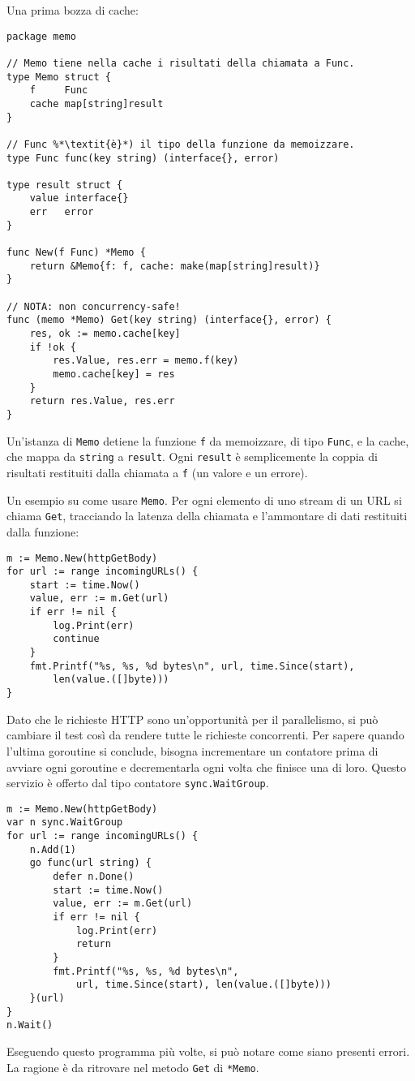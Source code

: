 \documentclass[../../thesis.tex]{subfiles}
\begin{document}
    Una prima bozza di cache:
    \begin{lstlisting}[frame = single,label={lst:lstlisting9-7.2}]
package memo

// Memo tiene nella cache i risultati della chiamata a Func.
type Memo struct {
    f     Func
    cache map[string]result
}

// Func %*\textit{è}*) il tipo della funzione da memoizzare.
type Func func(key string) (interface{}, error)

type result struct {
    value interface{}
    err   error
}

func New(f Func) *Memo {
    return &Memo{f: f, cache: make(map[string]result)}
}

// NOTA: non concurrency-safe!
func (memo *Memo) Get(key string) (interface{}, error) {
    res, ok := memo.cache[key]
    if !ok {
        res.Value, res.err = memo.f(key)
        memo.cache[key] = res
    }
    return res.Value, res.err
}
    \end{lstlisting}
    Un'istanza di \verb"Memo" detiene la funzione \verb"f" da memoizzare, di tipo \verb"Func", e la cache, che mappa da \verb"string" a \verb"result".
    Ogni \verb"result" è semplicemente la coppia di risultati restituiti dalla chiamata a \verb"f" (un valore e un errore).
    \hfill \vspace{12pt}

    Un esempio su come usare \verb"Memo".
    Per ogni elemento di uno stream di un URL si chiama \verb"Get", tracciando la latenza della chiamata e l'ammontare di dati restituiti dalla funzione:
    \begin{lstlisting}[frame = single,label={lst:lstlisting9-7.3}]
m := Memo.New(httpGetBody)
for url := range incomingURLs() {
    start := time.Now()
    value, err := m.Get(url)
    if err != nil {
        log.Print(err)
        continue
    }
    fmt.Printf("%s, %s, %d bytes\n", url, time.Since(start),
        len(value.([]byte)))
}
    \end{lstlisting}
    Dato che le richieste HTTP sono un'opportunità per il parallelismo, si può cambiare il test così da rendere tutte le richieste concorrenti.
    Per sapere quando l'ultima goroutine si conclude, bisogna incrementare un contatore prima di avviare ogni goroutine e decrementarla ogni volta che finisce una di loro.
    Questo servizio è offerto dal tipo contatore \verb"sync.WaitGroup".
    \begin{lstlisting}[frame = single,label={lst:lstlisting9-7.4}]
m := Memo.New(httpGetBody)
var n sync.WaitGroup
for url := range incomingURLs() {
    n.Add(1)
    go func(url string) {
        defer n.Done()
        start := time.Now()
        value, err := m.Get(url)
        if err != nil {
            log.Print(err)
            return
        }
        fmt.Printf("%s, %s, %d bytes\n",
            url, time.Since(start), len(value.([]byte)))
    }(url)
}
n.Wait()
    \end{lstlisting}
    Eseguendo questo programma più volte, si può notare come siano presenti errori.
    La ragione è da ritrovare nel metodo \verb"Get" di \verb"*Memo".
    \hfill \vspace{12pt}
\end{document}
